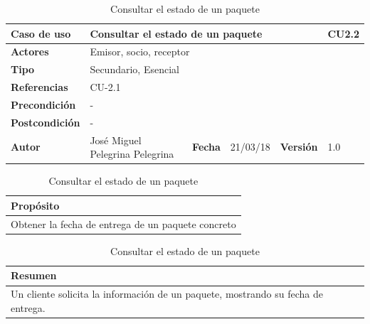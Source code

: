 \documentclass[12pt,spanish]{article}
\begin{document}
\begin{table}[H]
\centering
\begin{tabular}{|m{3cm}|m{4cm}|m{2cm}|m{2cm}|m{2cm}|m{1cm}|}
\hline
\textbf{Caso de uso} &  \multicolumn{4}{m{8cm}|}{Consultar el estado de un paquete} \vline &  \cellcolor{gray!40}CU2.2 \\
\hline
\textbf{Actores} & \multicolumn{5}{m{8cm}|}{Emisor, socio, receptor} \\
\hline
\textbf{Tipo} & \multicolumn{5}{m{8cm}|}{Secundario, Esencial} \\
\hline
\textbf{Referencias} &\multicolumn{5}{m{8cm}|}{CU-2.1} \\
\hline
\textbf{Precondición} & \multicolumn{5}{m{8cm}|}{-} \\
\hline
\textbf{Postcondición} & \multicolumn{5}{m{8cm}|}{-} \\
\hline
\textbf{Autor} & José Miguel Pelegrina Pelegrina & \textbf{Fecha} & 21/03/18 & \textbf{Versión} & 1.0 \\
\hline
\end{tabular}

\vspace{1cm}

\begin{tabular}{|m{16.2cm}|}
\hline
\textbf{Propósito} \\
\hline
Obtener la fecha de entrega de un paquete concreto \\
\hline
\end{tabular}

\vspace{1cm}

\begin{tabular}{|m{16.2cm}|}
\hline
\textbf{Resumen} \\
\hline
Un cliente solicita la información de un paquete, mostrando su fecha de entrega. \\
\hline
\end{tabular}

\caption{Consultar el estado de un paquete}
\label{cu:2}
\end{table}
 

\end{document}
